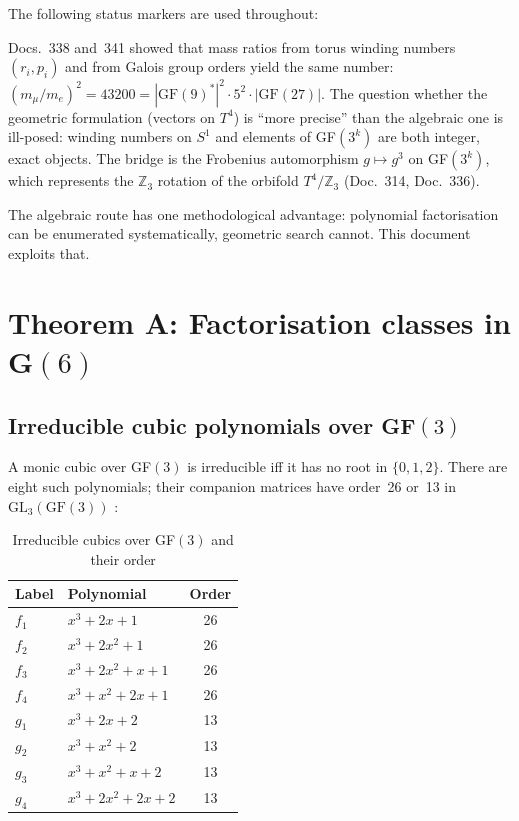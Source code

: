 The following status markers are used throughout:


Docs.~338 and~341 showed that mass ratios from torus winding numbers $(r_i, p_i)$
and from Galois group orders yield the same number:
$(m_\mu/m_e)^2 = 43200 = |\text{GF}(9)^*|^2 \cdot 5^2 \cdot |\text{GF}(27)|$.
The question whether the geometric formulation (vectors on $T^4$) is ``more precise''
than the algebraic one is ill-posed: winding numbers on $S^1$ and elements of
GF$(3^k)$ are both integer, exact objects. The bridge is the Frobenius automorphism
$g \mapsto g^3$ on GF$(3^k)$, which represents the $\mathbb{Z}_3$ rotation of the
orbifold $T^4/\mathbb{Z}_3$ (Doc.~314, Doc.~336).

The algebraic route has one methodological advantage: polynomial factorisation can
be enumerated systematically, geometric search cannot. This document exploits that.

\section{Theorem A: Factorisation classes in G$(6)$}

\subsection{Irreducible cubic polynomials over GF$(3)$}

A monic cubic over GF$(3)$ is irreducible iff it has no root in $\{0,1,2\}$.
There are eight such polynomials; their companion matrices have order~26 or~13
in $\text{GL}_3(\text{GF}(3))$ \BM:

\begin{table}[H]
\centering
\caption{Irreducible cubics over GF$(3)$ and their order}
\begin{tabular}{llc}
\toprule
Label & Polynomial & Order \\
\midrule
$f_1$ & $x^3 + 2x + 1$ & 26 \\
$f_2$ & $x^3 + 2x^2 + 1$ & 26 \\
$f_3$ & $x^3 + 2x^2 + x + 1$ & 26 \\
$f_4$ & $x^3 + x^2 + 2x + 1$ & 26 \\
\midrule
$g_1$ & $x^3 + 2x + 2$ & 13 \\
$g_2$ & $x^3 + x^2 + 2$ & 13 \\
$g_3$ & $x^3 + x^2 + x + 2$ & 13 \\
$g_4$ & $x^3 + 2x^2 + 2x + 2$ & 13 \\
\bottomrule
\end{tabular}
\end{table}

